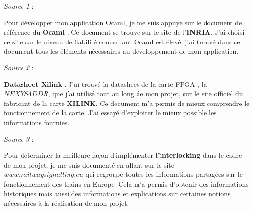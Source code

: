 \emph{Source 1} :

\smallskip

Pour développer mon application Ocaml, je me suis appuyé sur le
document de référence du \textbf{Ocaml} \cite{OCAML}. Ce document se trouve sur
le site de l'\textbf{INRIA}. J'ai choisi ce site car le niveau de
fiabilité concernant Ocaml est élevé. j'ai trouvé dans ce document tous les éléments nécessaires au développement de mon application.

\bigskip

\emph{Source 2} :

\smallskip

\textbf{Datasheet Xilink} \cite{Xilink}. J'ai trouvé la datasheet de la
carte FPGA , la $NEXYS
4DDR$, que j'ai utilisé tout au long de mon projet, sur le site
officiel du fabricant  de la carte \textbf{XILINK}. Ce
document m'a permis de mieux comprendre le fonctionnement de la carte.
J'ai essayé d'exploiter le mieux possible les informations fournies.

\bigskip

\emph{Source 3} :

\smallskip

Pour déterminer la meilleure façon d'implémenter
\textbf{l'interlocking} dans le cadre de mon projet, je me suis documenté en allant sur
le site $www.railwaysignalling.eu$ \cite{IXL} qui regroupe toutes les
informations partagées sur le fonctionnement des trains en
Europe. Cela m'a permis d'obtenir des informations historiques mais
aussi des informations et explications sur certaines  notions
nécessaires à la réalisation  de mon projet.


\newpage






